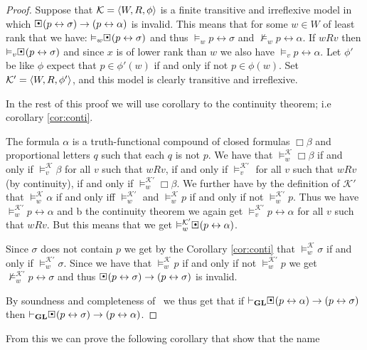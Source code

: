 \documentclass[../main.tex]{subfiles}
\begin{document}
\begin{proof}
	Suppose that $\mathcal{K}=\langle W,R,\phi\rangle$ is a finite transitive and irreflexive model
	in which
	$\sBox(p\leftrightarrow\sigma)\rightarrow(p\leftrightarrow\alpha)$ is
	invalid. This means that for some $w\in W$ of least rank that we have:
	$\vDash_w\sBox(p\leftrightarrow\sigma)$ and thus $\vDash_w
	p\leftrightarrow\sigma$ and $\not\vDash_w p\leftrightarrow\alpha$. If $wRv$
	then $\vDash_v\sBox(p\leftrightarrow\sigma)$ and since $x$ is of lower
	rank than $w$ we also have $\vDash_v p\leftrightarrow\alpha$. Let
	$\phi'$ be like $\phi$ expect that $p\in\phi'(w)$ if and only if
	not $p\in\phi(w)$. Set $\mathcal{K}'=\langle W,R,\phi'\rangle$, and this model
	is clearly transitive and irreflexive.

	In the rest of this proof we will use corollary to the continuity
	theorem; i.e corollary \ref{cor:conti}.


	The formula $\alpha$ is a truth-functional compound  of closed formulas $\Box\beta$ and proportional letters $q$
	such that each $q$ is not $p$. We have that
	$\vDash_w^\mathcal{K}\Box\beta$ if and only if
	$\vDash_v^\mathcal{K}\beta$ for all $v$ such that $wRv$, if and only if
	$\vDash_v^{\mathcal{K}'}$ for all $v$ such that $wRv$ (by continuity),
	if and only if $\vDash_w^{\mathcal{K}'}\Box\beta$. We further have by
	the definition of $\mathcal{K}'$ that $\vDash_w^\mathcal{K}\alpha$ if
	and only iff $\vDash_w^{\mathcal{K}'}$ and $\vDash_w^\mathcal{K}p$ if
	and only if not $\vDash_w^{\mathcal{K}'}p$. Thus we have
	$\vDash_w^{\mathcal{K}'}p\leftrightarrow\alpha$ and b the continuity  theorem
	we again get $\vDash_v^{\mathcal{K}'}p\leftrightarrow\alpha$ for all
	$v$ such that $wRv$. But this means that we get
	$\vDash_w^{\mathcal{K}'}\sBox(p\leftrightarrow\alpha)$.
	
	Since $\sigma$ does not contain $p$ we get by the Corollary
	\ref{cor:conti} that
	$\vDash_w^\mathcal{K}\sigma$ if and only if
	$\vDash_w^{\mathcal{K}'}\sigma$. Since we have that
	$\vDash_w^\mathcal{K} p$ if and only if not $\vDash_w^{\mathcal{K}'}p$
	we get $\not\vDash_w^{\mathcal{K}'}p\leftrightarrow \sigma$ and thus
	$\sBox(p\leftrightarrow\sigma)\rightarrow(p\leftrightarrow\sigma)$ is
	invalid.

	By soundness and completeness of \GL\ we thus get that if
	$\vdash_\GL\sBox(p\leftrightarrow\alpha)\rightarrow(p\leftrightarrow\sigma)$
	then
	$\vdash_\GL\sBox(p\leftrightarrow\sigma)\rightarrow(p\leftrightarrow\alpha)$.
\end{proof}
From this we can prove the following corollary that show that the name
\end{document}
